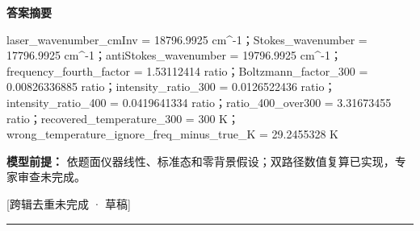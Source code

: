\documentclass[UTF8,11pt,a4paper]{ctexart}
\begin{document}
\noindent\textbf{答案摘要}\par
laser\_wavenumber\_cmInv = 18796.9925 cm\textasciicircum{}-1；Stokes\_wavenumber = 17796.9925 cm\textasciicircum{}-1；antiStokes\_wavenumber = 19796.9925 cm\textasciicircum{}-1；frequency\_fourth\_factor = 1.53112414 ratio；Boltzmann\_factor\_300 = 0.00826336885 ratio；intensity\_ratio\_300 = 0.0126522436 ratio；intensity\_ratio\_400 = 0.0419641334 ratio；ratio\_400\_over300 = 3.31673455 ratio；recovered\_temperature\_300 = 300 K；wrong\_temperature\_ignore\_freq\_minus\_true\_K = 29.2455328 K\par
\noindent\textbf{模型前提：}
依题面仪器线性、标准态和零背景假设；双路径数值复算已实现，专家审查未完成。\par
\noindent\textcolor{red!65!black}{[跨辑去重未完成 · 草稿]} \par
\medskip\hrule\medskip
{}
\end{document}
